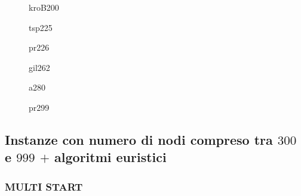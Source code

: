 \documentclass[11pt]{article}
\begin{document}
\begin{figure}[htbp]
    \centering
    \label{fig:kroB200}
    \caption{kroB200}
\end{figure}

\begin{figure}[htbp]
    \centering
    \label{fig:tsp225}
    \caption{tsp225}
\end{figure}

\begin{figure}[htbp]
    \centering
    \label{fig:pr226}
    \caption{pr226}
\end{figure}

\begin{figure}[htbp]
    \centering
    \label{fig:gil262}
    \caption{gil262}
\end{figure}

\begin{figure}[htbp]
    \centering
    \label{fig:a280}
    \caption{a280}
\end{figure}

\begin{figure}[htbp]
    \centering
    \label{fig:pr299}
    \caption{pr299}
\end{figure}

\FloatBarrier

\subsection*{Instanze con numero di nodi compreso tra \textbf{$300$} e \textbf{$999$} $+$ algoritmi euristici}

\subsubsection*{MULTI START}
\end{document}
